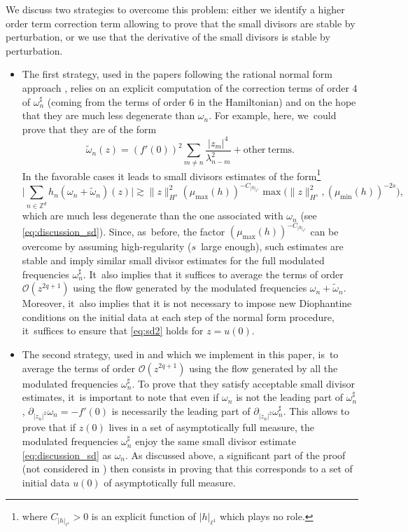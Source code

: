 \documentclass[JEP,XML,SOM,Unicode,published]{cedram}
\theoremstyle{plain}
\theoremstyle{definition}
\newcommand{\1}{\mathbf{1}}
\begin{document}
We discuss two strategies to overcome this problem: either we identify a higher order term correction term allowing to prove that the small divisors are stable by perturbation, or we use that the derivative of the small divisors is stable by perturbation.
\begin{itemize}
\item The first strategy, used in the papers following the rational normal form approach \cite{KillBill,KtA,LX23}, relies on an explicit computation of the correction terms of order $4$ of $\omega_n^\sharp$ (coming from the terms of order 6 in the Hamiltonian) and on the hope that they are much less degenerate than $\omega_n$. For example, here, we~could prove that they are of the form
\[
\widetilde{\omega}_n(z) = (f'(0))^2 \sum_{m \neq n} \frac{|z_m|^4}{\lambda_{n-m}^2} + \mathrm{other \ terms}.
\]
In the favorable cases it leads to small divisors estimates of the form\footnote{where $C_{|h|_{\ell^1}}>0$ is an explicit function of $|h|_{\ell^1}$ which plays no role.}
\begin{equation}
\label{eq:sd2}
\Big| \sum_{n\in \mathbb{Z}^d} h_n (\omega_{n} + \widetilde{\omega}_n)(z) \Big| \gtrsim \| z\|_{H^s}^2 (\mu_{\max}(h))^{-C_{|h|_{\ell^1}}} \max\big(\| z\|_{H^s}^2, (\mu_{\min}(h))^{-2s} \big),
\end{equation}
which are much less degenerate than the one associated with $\omega_n$ (see \eqref{eq:discussion_sd}). Since, as~before, the factor $ (\mu_{\max}(h))^{-C_{|h|_{\ell^1}}}$ can be overcome by assuming high-regularity ($s$~large enough), such estimates are stable and imply similar small divisor estimates for the full modulated frequencies $\omega_n^\sharp$. It~also implies that it suffices to average the terms of order $\mathcal{O}(z^{2q+1})$ using the flow generated by the modulated frequencies $\omega_n+\widetilde{\omega}_n$. Moreover, it~also implies that it is not necessary to impose new Diophantine conditions on the initial data at each step of the normal form procedure, it~suffices to ensure that \eqref{eq:sd2} holds for $z=u(0)$.
\item The second strategy, used in \cite{Bou00} and which we implement in this paper, is~to average the terms of order $\mathcal{O}(z^{2q+1})$ using the flow generated by all the modulated frequencies $\omega_n^\sharp$. To prove that they satisfy acceptable small divisor estimates, it~is important to note that even if $\omega_n$ is not the leading part of $\omega_n^\sharp$, $\partial_{|z_n|^2} \omega_n = - f'(0)$ is necessarily the leading part of $\partial_{|z_n|^2} \omega_n^\sharp$. This allows to prove that if $z(0)$ lives in a set of asymptotically full measure, the modulated frequencies $\omega_n^\sharp$ enjoy the same small divisor estimate \eqref{eq:discussion_sd} as $\omega_n$. As discussed above, a significant part of the proof (not considered in \cite{Bou00}) then consists in proving that this corresponds to a set of initial data $u(0)$ of asymptotically full measure.
\end{itemize}
\end{document}
